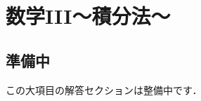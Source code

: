 \documentclass[../../ms_a.tex]{subfiles}
\begin{document}
\section{数学III～積分法～}

\subsection*{準備中}
この大項目の解答セクションは整備中です．
\end{document}
